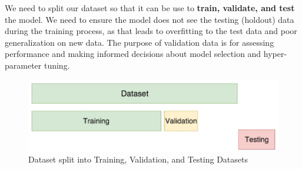 We need to split our dataset so that it can be use to\textbf{ train, validate, and test }the model. We need to ensure the model does not see the testing (holdout) data during the training process, as that leads to overfitting to the test data and poor generalization on new data. The purpose of validation data is for assessing performance and making informed decisions about model selection and hyper-parameter tuning. 

\begin{figure}[h!t]
    \centering
    \includegraphics[width=0.75\linewidth]{datatypes.png}
    \caption{Dataset split into Training, Validation, and Testing Datasets}
    \label{fig:enter-label}
\end{figure}

